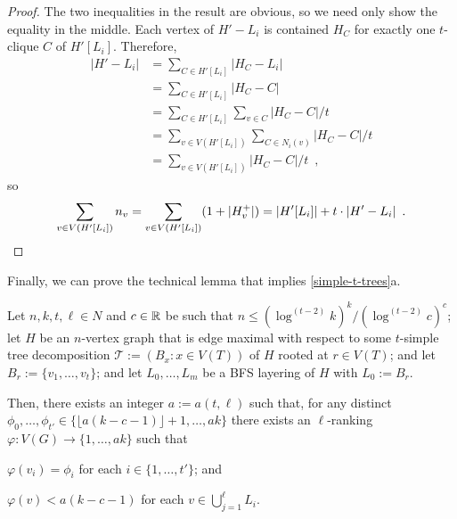 \documentclass[kpfonts]{patmorin}
\theoremstyle{named}
\newcommand{\weirdref}[2]{\cref{#1}#2}
\begin{document}
\begin{proof}
    The two inequalities in the result are obvious, so we need only show the equality in the middle.
    Each vertex of $H'-L_i$ is contained $H_C$ for exactly one $t$-clique $C$ of $H'[L_i]$.  Therefore,
    \begin{align*}
        |H'-L_i|
        & = \sum_{C\in H'[L_i]} |H_C-L_i| \\
        & = \sum_{C\in H'[L_i]} |H_C-C| \\
        & = \sum_{C\in H'[L_i]}\sum_{v\in C} |H_C-C|/t \\
        & = \sum_{v\in V(H'[L_i])}\sum_{C\in N_i(v)} |H_C-C|/t \\
        & = \sum_{v\in V(H'[L_i])}|H_C-C|/t \enspace ,
    \end{align*}
    so
    \[  \sum_{v\in V(H'[L_i])} n_v = \sum_{v\in V(H'[L_i])}(1+|H^+_v|)
      = |H'[L_i]| + t\cdot|H'-L_i| \enspace . \qedhere
    \]
\end{proof}

Finally, we can prove the technical lemma that implies \weirdref{simple-t-trees}{a}.

\begin{lem}\label{t-tree-technical}
    Let $n,k,t,\ell\in N$ and $c\in\mathbb{R}$ be such that $n\le (\log^{(t-2)} k)^k/(\log^{(t-2)} c)^{c}$;
    let $H$ be an $n$-vertex graph that is edge maximal with respect to some $t$-simple tree decomposition $\mathcal{T}:=(B_x:x\in V(T))$ of $H$ rooted at $r\in V(T)$; and
    let $B_r:=\{v_1,\ldots,v_{t}\}$; and
    let $L_0,\ldots,L_m$ be a BFS layering of $H$ with $L_0:=B_r$.

    Then, there exists an integer $a:=a(t,\ell)$ such that, for any distinct $\phi_0,\ldots,\phi_{t'}\in \{\lfloor a(k-c-1)\rfloor+1,\ldots,ak\}$ there exists an $\ell$-ranking $\varphi:V(G)\to\{1,\ldots,ak\}$ such that
    \begin{compactenum}[(R1)]
        \item $\varphi(v_i)=\phi_i$ for each $i\in\{1,\ldots,t'\}$; and
        \item $\varphi(v)<a(k-c-1)$ for each $v\in\bigcup_{j=1}^{\ell} L_i$.
    \end{compactenum}
\end{lem}
\end{document}
